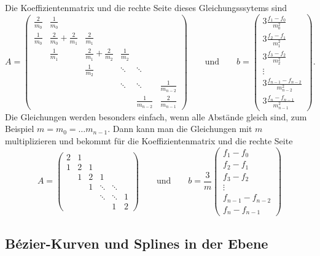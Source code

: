 Die Koeffizientenmatrix und die rechte Seite dieses Gleichungsssytems sind
\[
A
=
\begin{pmatrix}
\displaystyle\frac{2}{m_0}
	&\displaystyle\frac{1}{m_0}
		&
			&
				&
					&
\\[8pt]
\displaystyle\frac{1}{m_0}
	&\displaystyle\frac{2}{m_0}+\frac{2}{m_1}
		&\displaystyle\frac{2}{m_1}
			&
				&
					&
\\[8pt]
	&\displaystyle\frac{1}{m_1}
		&\displaystyle\frac{2}{m_1}+\frac{2}{m_2}
			&\displaystyle\frac{1}{m_2}
				&
					&
\\[8pt]
	&
		&\displaystyle\frac{1}{m_2}
			&\ddots
				&\ddots
					&
\\[8pt]
	&
		&
			&\ddots
				&\ddots
					&\displaystyle\frac{1}{m_{n-2}}
\\[8pt]
	&
		&
			&
				&\displaystyle\frac{1}{m_{n-2}}
					&\displaystyle\frac{2}{m_{n-1}}
\end{pmatrix}
\qquad\text{und}\qquad
b
=
\begin{pmatrix}
\displaystyle3\frac{f_1-f_0}{m_0^2} \\[8pt]
\displaystyle3\frac{f_2-f_1}{m_1^2} \\[8pt]
\displaystyle3\frac{f_3-f_2}{m_2^2} \\[8pt]
\vdots \\[8pt]
\displaystyle3\frac{f_{n-1}-f_{n-2}}{m_{n-2}^2} \\[8pt]
\displaystyle3\frac{f_n-f_{n-1}}{m_{n-1}^2} 
\end{pmatrix}.
\]
Die Gleichungen werden besonders einfach, wenn alle Abstände gleich sind,
zum Beispiel $m=m_0=\dots m_{n-1}$.
Dann kann man die Gleichungen mit $m$ multiplizieren und bekommt für die
Koeffizientenmatrix und die rechte Seite
\[
A
=
\begin{pmatrix}
2&1& &      &      & \\
1&2&1&      &      & \\
 &1&2&1     &      & \\
 & &1&\ddots&\ddots& \\
 & & &\ddots&\ddots&1\\
 & & &      &     1&2
\end{pmatrix}
\qquad\text{und}\qquad
b
=
\frac{3}{m}
\begin{pmatrix}
f_1-f_0\\
f_2-f_1\\
f_3-f_2\\
\vdots\\
f_{n-1}-f_{n-2}\\
f_n-f_{n-1}

\end{pmatrix}
\]

%
%
\subsection{Bézier-Kurven und Splines in der Ebene
\label{buch:subsection:bezier}}

